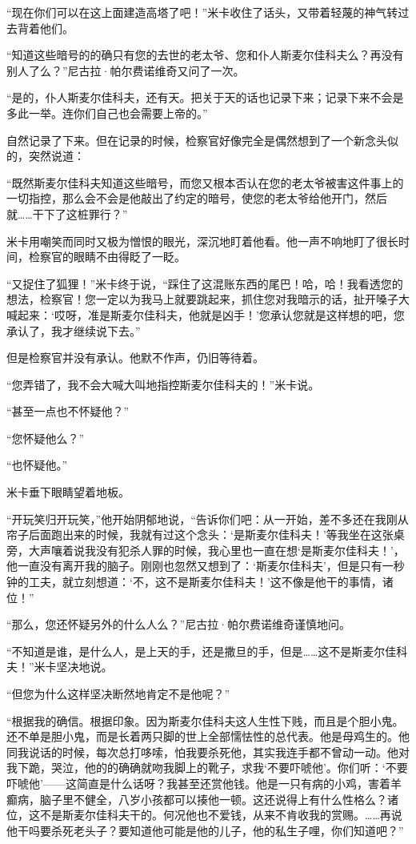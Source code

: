 \par “现在你们可以在这上面建造高塔了吧！”米卡收住了话头，又带着轻蔑的神气转过去背着他们。
\par “知道这些暗号的的确只有您的去世的老太爷、您和仆人斯麦尔佳科夫么？再没有别人了么？”尼古拉·帕尔费诺维奇又问了一次。
\par “是的，仆人斯麦尔佳科夫，还有天。把关于天的话也记录下来；记录下来不会是多此一举。连你们自己也会需要上帝的。”
\par 自然记录了下来。但在记录的时候，检察官好像完全是偶然想到了一个新念头似的，突然说道：
\par “既然斯麦尔佳科夫知道这些暗号，而您又根本否认在您的老太爷被害这件事上的一切指控，那么会不会是他敲出了约定的暗号，使您的老太爷给他开门，然后就……干下了这桩罪行？”
\par 米卡用嘲笑而同时又极为憎恨的眼光，深沉地盯着他看。他一声不响地盯了很长时间，检察官的眼睛不由得眨了一眨。
\par “又捉住了狐狸！”米卡终于说，“踩住了这混账东西的尾巴！哈，哈！我看透您的想法，检察官！您一定以为我马上就要跳起来，抓住您对我暗示的话，扯开嗓子大喊起来：‘哎呀，准是斯麦尔佳科夫，他就是凶手！’您承认您就是这样想的吧，您承认了，我才继续说下去。”
\par 但是检察官并没有承认。他默不作声，仍旧等待着。
\par “您弄错了，我不会大喊大叫地指控斯麦尔佳科夫的！”米卡说。
\par “甚至一点也不怀疑他？”
\par “您怀疑他么？”
\par “也怀疑他。”
\par 米卡垂下眼睛望着地板。
\par “开玩笑归开玩笑，”他开始阴郁地说，“告诉你们吧：从一开始，差不多还在我刚从帘子后面跑出来的时候，我就有过这个念头：‘是斯麦尔佳科夫！’等我坐在这张桌旁，大声嚷着说我没有犯杀人罪的时候，我心里也一直在想‘是斯麦尔佳科夫！’，他一直没有离开我的脑子。刚刚也忽然又想到了：‘斯麦尔佳科夫’，但是只有一秒钟的工夫，就立刻想道：‘不，这不是斯麦尔佳科夫！’这不像是他干的事情，诸位！”
\par “那么，您还怀疑另外的什么人么？”尼古拉·帕尔费诺维奇谨慎地问。
\par “不知道是谁，是什么人，是上天的手，还是撒旦的手，但是……这不是斯麦尔佳科夫！”米卡坚决地说。
\par “但您为什么这样坚决断然地肯定不是他呢？”
\par “根据我的确信。根据印象。因为斯麦尔佳科夫这人生性下贱，而且是个胆小鬼。还不单是胆小鬼，而是长着两只脚的世上全部懦怯性的总代表。他是母鸡生的。他同我说话的时候，每次总打哆嗦，怕我要杀死他，其实我连手都不曾动一动。他对我下跪，哭泣，他的的确确就吻我脚上的靴子，求我‘不要吓唬他’。你们听：‘不要吓唬他’——这简直是什么话呀？我甚至还赏他钱。他是一只有病的小鸡，害着羊癫病，脑子里不健全，八岁小孩都可以揍他一顿。这还说得上有什么性格么？诸位，这不是斯麦尔佳科夫干的。何况他也不爱钱，从来不肯收我的赏赐。……再说他干吗要杀死老头子？要知道他可能是他的儿子，他的私生子哩，你们知道吧？”
